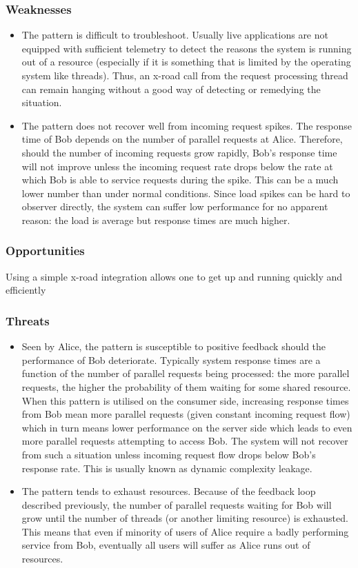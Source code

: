\documentclass[10pt,a4paper]{article}
\begin{document}
\subsubsection{Weaknesses}
\begin{itemize}
	\item The pattern is difficult to troubleshoot. Usually live applications are not equipped with sufficient telemetry to detect the reasons the system is running out of a resource (especially if it is something that is limited by the operating system like threads). Thus, an x-road call from the request processing thread can remain hanging without a good way of detecting or remedying the situation.
	\item The pattern does not recover well from incoming request spikes. The response time of Bob depends on the number of parallel requests at Alice. Therefore, should the number of incoming requests grow rapidly, Bob's response time will not improve unless the incoming request rate drops below the rate at which Bob is able to service requests during the spike. This can be a much lower number than under normal conditions. Since load spikes can be hard to observer directly, the system can suffer low performance for no apparent reason: the load is average but response times are much higher. 
\end{itemize}
	
\subsubsection{Opportunities}
Using a simple x-road integration allows one to get up and running quickly and efficiently

\subsubsection{Threats}
	\begin{itemize}
		\item Seen by Alice, the pattern is susceptible to positive feedback should the performance of Bob deteriorate. Typically system response times are a function of the number of parallel requests being processed: the more parallel requests, the higher the probability of them waiting for some shared resource. When this pattern is utilised on the consumer side, increasing response times from Bob mean more parallel requests (given constant incoming request flow) which in turn means lower performance on the server side which leads to even more parallel requests attempting to access Bob. The system will not recover from such a situation unless incoming request flow drops below Bob's response rate. This is usually known as dynamic complexity leakage.
		\item The pattern tends to exhaust resources. Because of the feedback loop described previously, the number of parallel requests waiting for Bob will grow until the number of threads (or another limiting resource) is exhausted. This means that even if minority of users of Alice require a badly performing service from Bob, eventually all users will suffer as Alice runs out of resources. 
	\end{itemize} 
\end{document}
